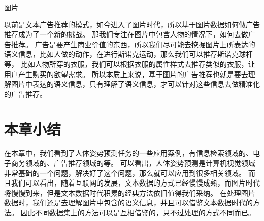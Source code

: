 图片

以前是文本广告推荐的模式，如今进入了图片时代，所以基于图片数据如何做广告推荐成为了一个新的挑战。
那我们专注在图片中包含人物的情况下，如何去做广告推荐。
广告是要产生商业价值的东西，所以我们尽可能去挖掘图片上所表达的语义信息，比如人做的动作，在进行斯诺克运动，那么我们可以推荐斯诺克球杆等，
比如人物所穿的衣服，我们可以根据衣服的属性样式去推荐类似的衣服，让用户产生购买的欲望需求。
所以本质上来说，基于图片的广告推荐也就是要去理解图片中表达的语义信息，只有理解了语义信息，才可以针对这些信息去做精准化的广告推荐。


\section{本章小结}
在本章中，我们看到了人体姿势预测任务的一些应用案例，有信息检索领域的、电子商务领域的、广告推荐领域的等。
可以看出，人体姿势预测是计算机视觉领域非常基础的一个问题，解决好了这个问题，那么就可以应用到很多相关领域。
而且我们可以看出，随着互联网的发展，文本数据的方式已经慢慢成熟，而图片时代将慢慢到来，但是文本数据时代积累的经典方法依旧值得我们采纳。
在处理图片数据时，我们还是去理解图片中包含的语义信息，并且可以借鉴文本数据时代的方法。
因此不同数据集上的方法可以是互相借鉴的，只不过处理的方式不同而已。
